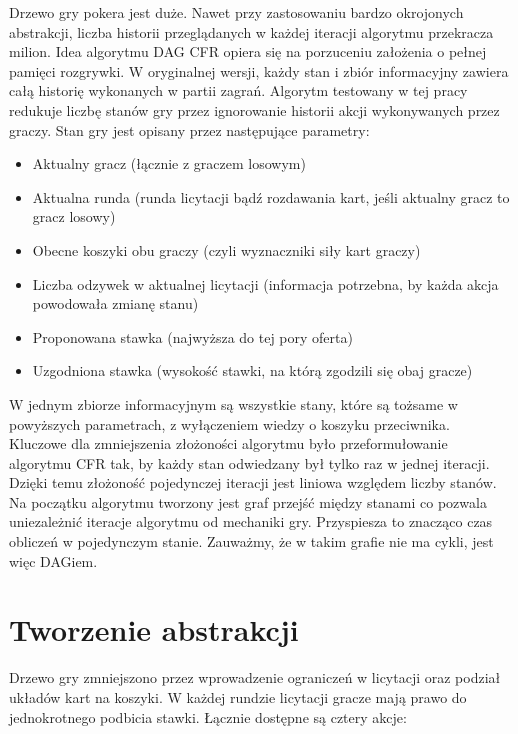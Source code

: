 \documentclass[licencjacka]{pracamgr}
\begin{document}
Drzewo gry pokera jest duże. Nawet przy zastosowaniu bardzo okrojonych abstrakcji, liczba historii przeglądanych w każdej
iteracji algorytmu przekracza milion. Idea algorytmu DAG CFR opiera się na porzuceniu założenia o pełnej pamięci rozgrywki.
W oryginalnej wersji, każdy stan i zbiór informacyjny zawiera całą historię wykonanych w partii zagrań. Algorytm testowany
w tej pracy redukuje liczbę stanów gry przez ignorowanie historii akcji wykonywanych
przez graczy. Stan gry jest opisany przez następujące parametry: \\

\begin{itemize}
\item Aktualny gracz (łącznie z graczem losowym)
\item Aktualna runda (runda licytacji bądź rozdawania kart, jeśli aktualny gracz to gracz losowy)
\item Obecne koszyki obu graczy (czyli wyznaczniki siły kart graczy)
\item Liczba odzywek w aktualnej licytacji (informacja potrzebna, by każda akcja powodowała zmianę stanu)
\item Proponowana stawka (najwyższa do tej pory oferta)
\item Uzgodniona stawka (wysokość stawki, na którą zgodzili się obaj gracze)
\end{itemize}

\noindent
W jednym zbiorze informacyjnym są wszystkie stany, które są tożsame w powyższych parametrach, z wyłączeniem
wiedzy o koszyku przeciwnika. \\

\noindent
Kluczowe dla zmniejszenia złożoności algorytmu było przeformułowanie algorytmu CFR tak, by każdy
stan odwiedzany był tylko raz w jednej iteracji. Dzięki temu złożoność pojedynczej iteracji jest
liniowa względem liczby stanów. Na początku algorytmu tworzony jest graf przejść między
stanami co pozwala uniezależnić iteracje algorytmu od mechaniki gry. Przyspiesza to znacząco
czas obliczeń w pojedynczym stanie. Zauważmy, że w takim grafie nie ma cykli, jest więc DAGiem.

\section{Tworzenie abstrakcji}

Drzewo gry zmniejszono przez wprowadzenie ograniczeń w licytacji oraz podział układów kart na koszyki.
W każdej rundzie licytacji gracze mają prawo do jednokrotnego podbicia stawki. Łącznie dostępne są cztery akcje:
\end{document}
